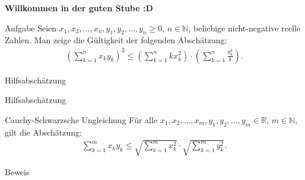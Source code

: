 \documentclass[10pt]{beamer}
\title{}
\author{Artur's \( \oint \) Mathematikstübchen}
\date{}
\def\bN{\mathbb{N}}
\def\bR{\mathbb{R}}
\begin{document}

\begin{frame}
    \begin{center}
        \textbf{\huge Willkommen in der guten Stube \newline \newline :D}
    \end{center}
\end{frame}




\begin{frame}
    \begin{alertblock}{Aufgabe}
        Seien \( x_{1}, x_{2}, \ldots, x_{n}, y_{1}, y_{2}, \ldots, y_{n} \geq 0 \), \( n \in \bN \), beliebige nicht-negative reelle Zahlen. Man zeige die Gültigkeit der folgenden Abschätzung:
        \begin{align*}
            \left( \sum_{k = 1}^{n} x_{k} y_{k} \right)^{2}
            \leq \left( \sum_{k = 1}^{n} k x_{k}^{2} \right) \cdot \left( \sum_{k = 1}^{n} \frac{y_{k}^{2}}{k} \right).
        \end{align*}
    \end{alertblock}
\end{frame}



\begin{frame}{Hilfsabschätzung}
    
\end{frame}



\begin{frame}{Hilfsabschätzung}
    \begin{block}{Cauchy-Schwarzsche Ungleichung}
        Für alle \( x_{1}, x_{2}, \ldots, x_{m}, y_{1}, y_{2}, \ldots, y_{m} \in \bR \), \( m \in \bN \), gilt die Abschätzung:
        \begin{align*}
            \sum_{k = 1}^{m} x_{k} y_{k}
            \leq \sqrt{\sum_{k = 1}^{m} x_{k}^{2}} \cdot \sqrt{\sum_{k = 1}^{m} y_{k}^{2}}.
        \end{align*}
    \end{block}
\end{frame}



\begin{frame}{Beweis}
    
\end{frame}
\end{document}
